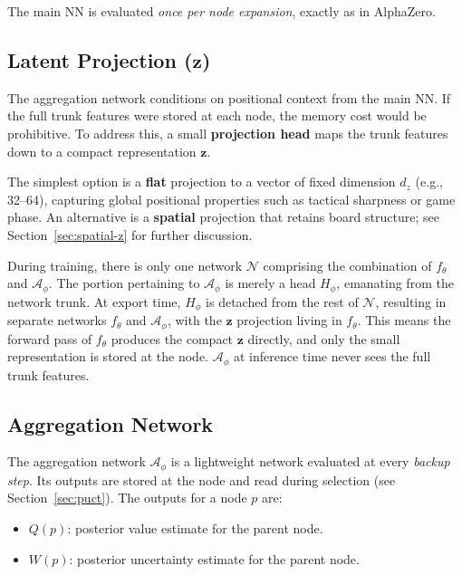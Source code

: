 \documentclass[11pt]{article}
\begin{document}
The main NN is evaluated \emph{once per node expansion}, exactly as in
AlphaZero.

\subsection{Latent Projection ($\mathbf{z}$)}
\label{sec:z}

The aggregation network conditions on positional context from the main NN. If
the full trunk features were stored at each node, the memory cost would be
prohibitive.
To address this, a small \textbf{projection head} maps the trunk features down
to a compact representation $\mathbf{z}$.

The simplest option is a \textbf{flat} projection to a vector of fixed
dimension $d_z$ (e.g., 32--64), capturing global positional properties such as
tactical sharpness or game phase. An alternative is a \textbf{spatial}
projection that retains board structure; see Section~\ref{sec:spatial-z} for
further discussion.

During training, there is only one network $\mathcal{N}$ comprising the
combination of $f_\theta$ and $\mathcal{A}_\phi$. The portion pertaining to
$\mathcal{A}_\phi$ is merely a head $H_\phi$, emanating from the network
trunk. At export time, $H_\phi$ is detached from the rest of $\mathcal{N}$,
resulting in separate networks $f_\theta$ and $\mathcal{A}_\phi$, with the
$\mathbf{z}$ projection living in $f_\theta$. This means the forward pass of
$f_\theta$ produces the compact $\mathbf{z}$ directly, and only the small
representation is stored at the node. $\mathcal{A}_\phi$ at inference time
never sees the full trunk features.

\subsection{Aggregation Network}
\label{sec:agg-net}

The aggregation network $\mathcal{A}_\phi$ is a lightweight network evaluated
at every \emph{backup step}. Its outputs are stored at the node and read
during selection (see Section~\ref{sec:puct}). The outputs for a node $p$ are:
\begin{itemize}[noitemsep]
  \item $Q(p)$: posterior value estimate for the parent node.
  \item $W(p)$: posterior uncertainty estimate for the parent node.
\end{itemize}
\end{document}
